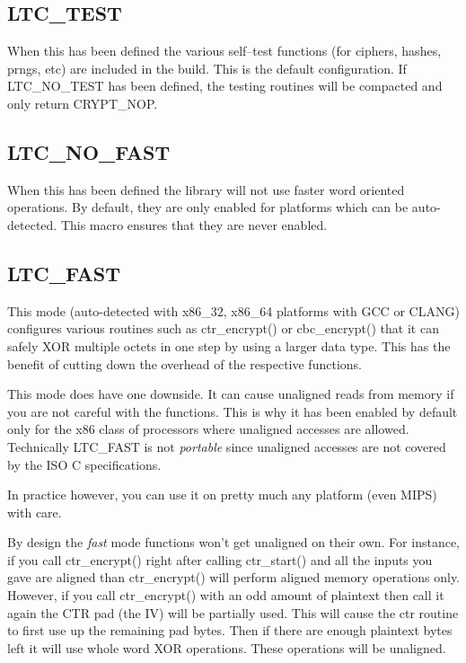 \documentclass[synpaper]{book}
\begin{document}
\subsection{LTC\_TEST}
When this has been defined the various self--test functions (for ciphers, hashes, prngs, etc) are included in the build.  This is the default configuration.
If LTC\_NO\_TEST has been defined, the testing routines will be compacted and only return CRYPT\_NOP.

\subsection{LTC\_NO\_FAST}
When this has been defined the library will not use faster word oriented operations.  By default, they are only enabled for platforms
which can be auto-detected.  This macro ensures that they are never enabled.

\subsection{LTC\_FAST}
This mode (auto-detected with x86\_32, x86\_64 platforms with GCC or CLANG) configures various routines such as ctr\_encrypt() or
cbc\_encrypt() that it can safely XOR multiple octets in one step by using a larger data type.  This has the benefit of
cutting down the overhead of the respective functions.

This mode does have one downside.  It can cause unaligned reads from memory if you are not careful with the functions.  This is why
it has been enabled by default only for the x86 class of processors where unaligned accesses are allowed.  Technically LTC\_FAST
is not \textit{portable} since unaligned accesses are not covered by the ISO C specifications.

In practice however, you can use it on pretty much any platform (even MIPS) with care.

By design the \textit{fast} mode functions won't get unaligned on their own.  For instance, if you call ctr\_encrypt() right after calling
ctr\_start() and all the inputs you gave are aligned than ctr\_encrypt() will perform aligned memory operations only.  However, if you
call ctr\_encrypt() with an odd amount of plaintext then call it again the CTR pad (the IV) will be partially used.  This will
cause the ctr routine to first use up the remaining pad bytes.  Then if there are enough plaintext bytes left it will use
whole word XOR operations.  These operations will be unaligned.
\end{document}
